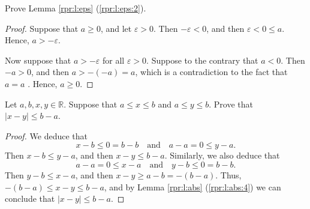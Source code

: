 \Newpage
\begin{exercise} %
	Prove Lemma \ref{rpr:l:eps} (\ref{rpr:l:eps:2}).
\end{exercise}

\begin{proof}
	Suppose that $a \geq 0$, and let $\varepsilon > 0$. Then $-\varepsilon < 0$, and then $\varepsilon < 0 \leq a$. Hence, $a > -\varepsilon$.

	Now suppose that $a > -\varepsilon$ for all $\varepsilon > 0$. Suppose to the contrary that $a < 0$. Then $-a > 0$, and then $a > -(-a) = a$, which is a contradiction to the fact that $a = a$ . Hence, $a \geq 0$.
\end{proof}


\Newpage
\begin{exercise} %
	Let $a, b, x, y \in \mathbb{R}$. Suppose that $a \leq x \leq b$ and $a \leq y \leq b$. Prove that $|x - y| \leq b - a$.
\end{exercise}

\begin{proof}
	We deduce that
	$$
		x - b \leq 0 = b - b \quad \text{and} \quad a - a = 0 \leq y - a.
	$$
	Then $x - b \leq y - a$, and then $x - y \leq b - a$. Similarly, we also deduce that
	$$
		a - a = 0 \leq x - a \quad \text{and} \quad y - b \leq 0 = b - b.
	$$
	Then $y - b \leq x - a$, and then $x - y \geq a - b = -(b - a)$. Thus, $-(b - a) \leq x - y \leq b - a$, and by Lemma \ref{rpr:l:abs} (\ref{rpr:l:abs:4}) we can conclude that $|x - y| \leq b - a$.
\end{proof}